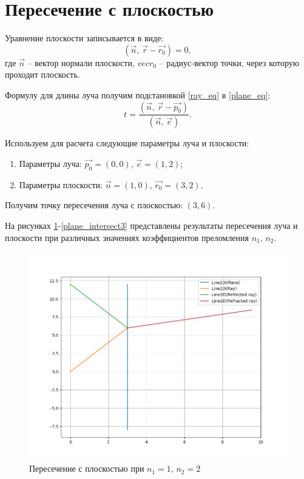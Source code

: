 \section{Пересечение с плоскостью}
{
	Уравнение плоскости записывается в виде:
	\begin{equation}\label{plane_eq}
	(\vec{n},\, \vec{r} - \vec{r_0}) = 0,
	\end{equation}
	где $\vec{n}$ -- вектор нормали плоскости, $vec{r_0}$ -- радиус-вектор точки, через которую проходит плоскость.
	
	Формулу для длины луча получим подстановкой \eqref{ray_eq} в \eqref{plane_eq}:
	\begin{equation}\label{ray_plane_distance}
	t = \frac{(\vec{n},\, \vec{r} - \vec{p_0})}{(\vec{n},\, \vec{e})}.
	\end{equation}
	
	Используем для расчета следующие параметры луча и плоскости:
	\begin{enumerate}
	\item Параметры луча: $\vec{p_0} = (0, 0)$, $\vec{e} = (1, 2)$;
	\item Параметры плоскости: $\vec{n} = (1, 0)$, $\vec{r_0} = (3, 2)$.
	\end{enumerate}
	
	Получим точку пересечения луча с плоскостью: $(3, 6)$.
	
	
	На рисунках \ref{plane_intersect1}-\ref{plane_intersect3} представлены результаты пересечения луча и плоскости при различных значениях коэффициентов преломления $n_1$, $n_2$.

	\begin{figure}[H]
		\centering
		\includegraphics[width=0.65\pagewidth]{plane_intersect1}
		\caption{Пересечение с плоскостью при $n_1 = 1$, $n_2 = 2$}
		\label{plane_intersect1}
	\end{figure}
	
}
